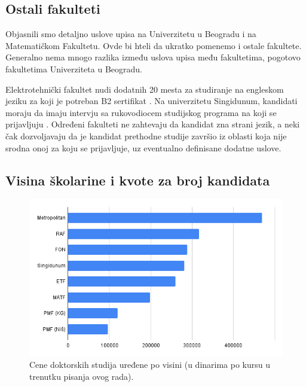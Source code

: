 \documentclass[a4paper]{article}
\begin{document}
\subsection{Ostali fakulteti}

Objasnili smo detaljno uslove upisa na Univerzitetu u Beogradu i na Matematičkom Fakultetu. Ovde bi hteli da ukratko pomenemo i ostale fakultete. Generalno nema mnogo razlika između uslova upisa među fakultetima, pogotovo fakultetima Univerziteta u Beogradu.  

Elektrotehnički fakultet nudi dodatnih 20 mesta za studiranje na engleskom jeziku za koji je potreban B2 sertifikat \cite{konkursETF}. Na univerzitetu Singidunum, kandidati moraju da imaju intervju sa rukovodiocem studijskog programa na koji se prijavljuju \cite{konkursSingidunum}. Određeni fakulteti ne zahtevaju da kandidat zna strani jezik, a neki čak dozvoljavaju da je kandidat prethodne studije završio iz oblasti koja nije srodna onoj za koju se prijavljuje, uz eventualno definisane dodatne uslove. 

\subsection{Visina školarine i kvote za broj kandidata}

\begin{figure}[h!]
\begin{center}
\includegraphics[scale=0.5]{skolarine.png}
\end{center}
\caption{Cene doktorskih studija uređene po visini (u dinarima po kursu u trenutku pisanja ovog rada).}
\label{fig:skolarine-bar}
\end{figure}
\end{document}
